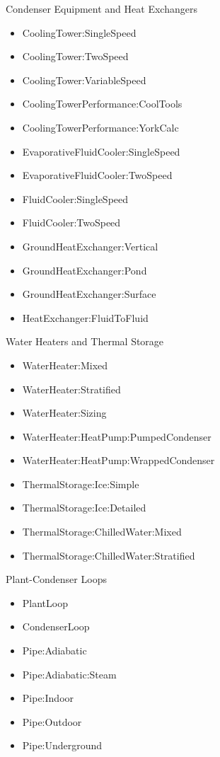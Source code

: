 Condenser Equipment and Heat Exchangers

\begin{itemize}
\tightlist
\item
  CoolingTower:SingleSpeed
\item
  CoolingTower:TwoSpeed
\item
  CoolingTower:VariableSpeed
\item
  CoolingTowerPerformance:CoolTools
\item
  CoolingTowerPerformance:YorkCalc
\item
  EvaporativeFluidCooler:SingleSpeed
\item
  EvaporativeFluidCooler:TwoSpeed
\item
  FluidCooler:SingleSpeed
\item
  FluidCooler:TwoSpeed
\item
  GroundHeatExchanger:Vertical
\item
  GroundHeatExchanger:Pond
\item
  GroundHeatExchanger:Surface
\item
  HeatExchanger:FluidToFluid
\end{itemize}

Water Heaters and Thermal Storage

\begin{itemize}
\tightlist
\item
  WaterHeater:Mixed
\item
  WaterHeater:Stratified
\item
  WaterHeater:Sizing
\item
  WaterHeater:HeatPump:PumpedCondenser
\item
  WaterHeater:HeatPump:WrappedCondenser
\item
  ThermalStorage:Ice:Simple
\item
  ThermalStorage:Ice:Detailed
\item
  ThermalStorage:ChilledWater:Mixed
\item
  ThermalStorage:ChilledWater:Stratified
\end{itemize}

Plant-Condenser Loops

\begin{itemize}
\tightlist
\item
  PlantLoop
\item
  CondenserLoop
\item
  Pipe:Adiabatic
\item
  Pipe:Adiabatic:Steam
\item
  Pipe:Indoor
\item
  Pipe:Outdoor
\item
  Pipe:Underground
\end{itemize}
